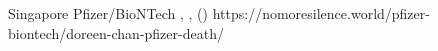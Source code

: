           {Singapore}
          {}
          {Pfizer/BioNTech}
          {}
          {
            ,
            ,
             ()
          }
          {https://nomoresilence.world/pfizer-biontech/doreen-chan-pfizer-death/}

